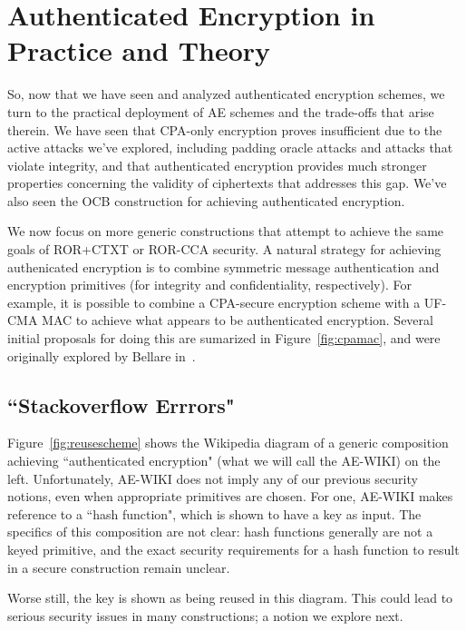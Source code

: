 \section{Authenticated Encryption in Practice and Theory}
\label{sec:authencpractice}

So, now that we have seen and analyzed authenticated encryption schemes, we turn to the practical deployment of AE schemes and the trade-offs that 
arise therein.  We have seen that CPA-only encryption proves insufficient due to the active attacks we've explored, including padding oracle attacks 
and attacks that violate integrity, and that authenticated encryption provides much stronger properties concerning the validity of ciphertexts that 
addresses this gap.  We've also seen the OCB construction for achieving authenticated encryption.

We now focus on more generic constructions that attempt to achieve the same goals of ROR+CTXT or ROR-CCA security.  A natural strategy for achieving 
authenicated encryption is to combine symmetric message authentication and encryption primitives (for integrity and confidentiality, respectively).  
For example, it is possible to combine a CPA-secure encryption scheme with a UF-CMA MAC to achieve what appears to be authenticated encryption.  
Several initial proposals for doing this are sumarized in Figure~\ref{fig:cpamac}, and were originally explored by Bellare in~\cite{Bellare2000}.


\subsection{``Stackoverflow Errrors"}

Figure~\ref{fig:reusescheme} shows the Wikipedia diagram of a generic composition achieving ``authenticated encryption" (what we will call the 
AE-WIKI) on the left.  Unfortunately, AE-WIKI does not imply any of our previous security notions, even when appropriate primitives are chosen.  For 
one, AE-WIKI makes reference to a ``hash function", which is shown to have a key as input.  The specifics of this composition are not clear: hash 
functions generally are not a keyed primitive, and the exact security requirements for a hash function to result in a secure construction remain 
unclear.

Worse still, the key is shown as being reused in this diagram.  This could lead to serious security issues in many constructions; a notion we explore 
next.


